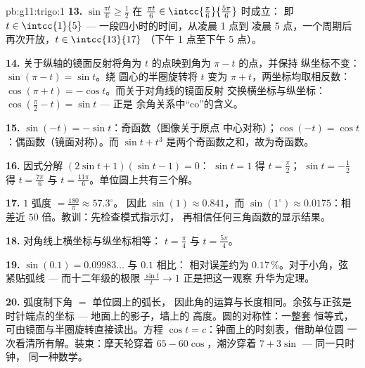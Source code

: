 \begin{solution}{pb:g11:trigo:1}
\textbf{13.} $\sin\frac{\pi t}{6} \geq \frac12$ 在
$\frac{\pi t}{6} \in \intcc{\frac\pi6}{\frac{5\pi}{6}}$ 时成立：
即 $t \in \intcc{1}{5}$ --- 一段四小时的时间，从凌晨 1 点到
凌晨 5 点，一个周期后再次开放，$t \in \intcc{13}{17}$
（下午 1 点至下午 5 点）。

\textbf{14.} 关于纵轴的镜面反射将角为
$t$ 的点映到角为 $\pi - t$ 的点，并保持
纵坐标不变：$\sin(\pi - t) = \sin t$。绕
圆心的半圈旋转将 $t$ 变为 $\pi + t$，两坐标均取相反数：
$\cos(\pi + t) = -\cos t$。而关于对角线的镜面反射
交换横坐标与纵坐标：
$\cos\left(\frac\pi2 - t\right) = \sin t$ --- 正是
余角关系中“co”的含义。

\textbf{15.} $\sin(-t) = -\sin t$：奇函数（图像关于原点
中心对称）；$\cos(-t) = \cos t$：偶函数（镜面对称）。而
$\sin t + t^3$ 是两个奇函数之和，故为奇函数。

\textbf{16.} 因式分解 $(2\sin t + 1)(\sin t - 1) = 0$：
$\sin t = 1$ 得 $t = \frac\pi2$；
$\sin t = -\frac12$ 得 $t = \frac{7\pi}{6}$ 与
$t = \frac{11\pi}{6}$。单位圆上共有三个解。

\textbf{17.} $1$ 弧度 $= \frac{180}{\pi} \approx 57.3^\circ$。
因此 $\sin(1) \approx 0.841$，而 $\sin(1^\circ) \approx
0.0175$：相差近 $50$ 倍。教训：先检查模式指示灯，
再相信任何三角函数的显示结果。

\textbf{18.} 对角线上横坐标与纵坐标相等：
$t = \frac\pi4$ 与 $t = \frac{5\pi}{4}$。

\textbf{19.} $\sin(0.1) = 0.09983\ldots$ 与 $0.1$ 相比：
相对误差约为 $0.17\,\%$。对于小角，弦
紧贴弧线 --- 而十二年级的极限
$\frac{\sin t}{t} \to 1$ 正是把这一观察
升华为定理。

\textbf{20.} 弧度制下角 $=$ 单位圆上的弧长，
因此角的运算与长度相同。余弦与正弦是
时针端点的坐标 --- 地面上的影子，墙上的
高度。圆的对称性：一整套
恒等式，可由镜面与半圈旋转直接读出。方程
$\cos t = c$：钟面上的时刻表，借助单位圆
一次看清所有解。装束：摩天轮穿着
$65 - 60\cos$，潮汐穿着 $7 + 3\sin$ --- 同一只时钟，
同一种数学。
\end{solution}
